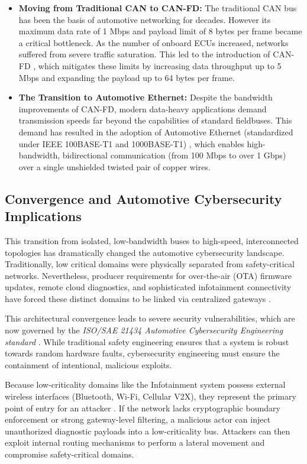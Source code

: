 \begin{itemize}
    \item \textbf{Moving from Traditional CAN to CAN-FD:} The traditional \gls{CAN} bus has been the basis of automotive networking for decades. However its maximum data rate of 1 Mbps and payload limit of 8 bytes per frame became a critical bottleneck. As the number of onboard \glspl{ECU} increased, networks suffered from severe traffic saturation. This led to the introduction of \gls{CAN-FD} \cite{canfd_comparison}, which mitigates these limits by increasing data throughput up to 5 Mbps and expanding the payload up to 64 bytes per frame.
    \item \textbf{The Transition to Automotive Ethernet:} Despite the bandwidth improvements of \gls{CAN-FD}, modern data-heavy applications demand transmission speeds far beyond the capabilities of standard fieldbuses. This demand has resulted in the adoption of Automotive Ethernet (standardized under IEEE 100BASE-T1 and 1000BASE-T1) \cite{siemens_automotive_ethernet}, which enables high-bandwidth, bidirectional communication (from 100 Mbps to over 1 Gbps) over a single unshielded twisted pair of copper wires.
\end{itemize}

\subsection{Convergence and Automotive Cybersecurity Implications}
This transition from isolated, low-bandwidth buses to high-speed, interconnected topologies has dramatically changed the automotive cybersecurity landscape. Traditionally, low critical domains were physically separated from safety-critical networks. Nevertheless, producer requirements for over-the-air (\gls{OTA}) firmware updates, remote cloud diagnostics, and sophisticated infotainment connectivity have forced these distinct domains to be linked via centralized gateways
\cite{srmtech_vehicle_architecture_2025}.

This architectural convergence leads to severe security vulnerabilities, which are now governed by the \textit{ISO/SAE 21434 Automotive Cybersecurity Engineering standard} \cite{iso21434_2021}. While traditional safety engineering ensures that a system is robust towards random hardware faults, cybersecurity engineering must ensure the containment of intentional, malicious exploits.

Because low-criticality domains like the Infotainment system possess external wireless interfaces (Bluetooth, Wi-Fi, Cellular V2X), they represent the primary point of entry for an attacker \cite{miller2015remote}. If the network lacks cryptographic boundary enforcement or strong gateway-level filtering, a malicious actor can inject unauthorized diagnostic payloads into a low-criticality bus. Attackers can then exploit internal routing mechanisms to perform a lateral movement and compromise safety-critical domains.

